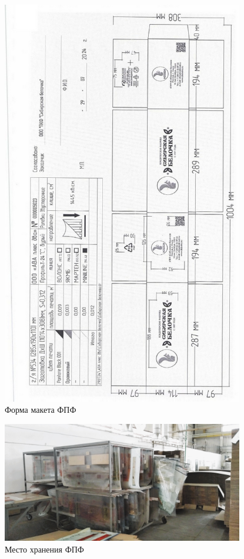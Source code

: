 \begin{figure}
\begin{center}
  \includegraphics[height=0.94\textheight, width=0.94\textwidth, keepaspectratio]{Pics/d17.jpg}
\end{center}
  \caption{Форма макета ФПФ}
  \label{pic:d17}
\end{figure}


\begin{figure}
\begin{center}
  \includegraphics[height=0.94\textheight, width=0.94\textwidth, keepaspectratio]{Pics 1/6 хранение фпф.jpg }
\end{center}
  \caption{Место хранения ФПФ}
  \label{pic:1/6 хранение фпф}
\end{figure}

